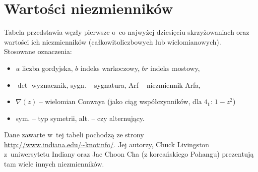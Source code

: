 \section{Wartości niezmienników}
\label{sec:table_of_invariants}
Tabela przedstawia węzły pierwsze o~co najwyżej dziesięciu skrzyżowaniach oraz wartości ich niezmienników (całkowitoliczbowych lub wielomianowych).
Stosowane oznaczenia:
\begin{itemize}
	\item $u$ liczba gordyjska, $b$ indeks warkoczowy, $br$ indeks mostowy,
	\item $\det$ wyznacznik, sygn. -- sygnatura, Arf -- niezmiennik Arfa,
	\item $\nabla(z)$ -- wielomian Conwaya (jako ciąg współczynników, dla $4_1$: $1-z^2$)
	\item sym. -- typ symetrii, alt. -- czy alternujący.
\end{itemize}

Dane zawarte w~tej tabeli pochodzą ze strony \url{http://www.indiana.edu/~knotinfo/}.
Jej autorzy, Chuck Livingston z~uniwersytetu Indiany  oraz Jae Choon Cha (z koreańskiego Pohangu) prezentują tam wiele innych niezmienników.

